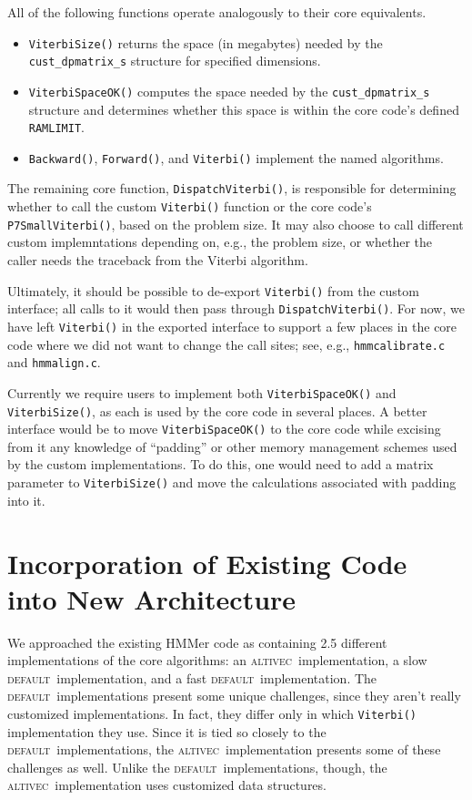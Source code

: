 \documentclass[letterpaper,10pt]{article}
\newcommand{\func}[1]{\texttt{#1()}}
\newcommand{\struct}[1]{\texttt{#1}}
\newcommand{\impl}[1]{\small{\textsc{\textsf{#1}}}}
\newcommand{\altv}{\impl{altivec}}
\newcommand{\deft}{\impl{default}}
\begin{document}
All of the following functions operate analogously to their
core equivalents.
\begin{itemize}

\item \func{ViterbiSize} returns the space (in megabytes) needed by
the \struct{cust\_dpmatrix\_s} structure for specified dimensions.

\item \func{ViterbiSpaceOK} computes the space needed by the
\struct{cust\_dpmatrix\_s} structure and determines whether
this space is within the core code's defined \texttt{RAMLIMIT}.

\item \func{Backward}, \func{Forward}, and \func{Viterbi} implement
the named algorithms.

\end{itemize}

The remaining core function, \func{DispatchViterbi}, is responsible
for determining whether to call the custom \func{Viterbi} function or
the core code's \func{P7SmallViterbi}, based on the problem size.  It
may also choose to call different custom implemntations depending on,
e.g., the problem size, or whether the caller needs the traceback from
the Viterbi algorithm.

Ultimately, it should be possible to de-export \func{Viterbi} from the
custom interface; all calls to it would then pass through
\func{DispatchViterbi}. For now, we have left \func{Viterbi} in the
exported interface to support a few places in the core code where we
did not want to change the call sites; see, e.g.,
\texttt{hmmcalibrate.c} and \texttt{hmmalign.c}.

Currently we require users to implement both \func{ViterbiSpaceOK} and
\func{ViterbiSize}, as each is used by the core code in several
places.  A better interface would be to move \func{ViterbiSpaceOK} to
the core code while excising from it any knowledge of ``padding'' or
other memory management schemes used by the custom implementations.
To do this, one would need to add a matrix parameter to
\func{ViterbiSize} and move the calculations associated with padding
into it.

\section*{Incorporation of Existing Code into New Architecture}

We approached the existing HMMer code as containing 2.5 different
implementations of the core algorithms: an \altv\ implementation, a
slow \deft\ implementation, and a fast \deft\ implementation.  The
\deft\ implementations present some unique challenges, since they
aren't really customized implementations.  In fact, they differ only
in which \func{Viterbi} implementation they use.  Since it is tied so
closely to the \deft\ implementations, the \altv\ implementation
presents some of these challenges as well.  Unlike the \deft\
implementations, though, the \altv\ implementation uses customized
data structures.
\end{document}
